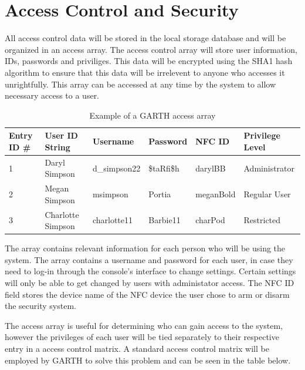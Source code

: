 \documentclass{report}
\begin{document}
\section{Access Control and Security}

All access control data will be stored in the local storage database and will be
organized in an access array. The access control array will store user
information, IDs, passwords and priviliges.  This data will be encrypted using
the SHA1 hash algorithm to ensure that this data will be irrelevent to anyone
who accesses it unrightfully. This array can be accessed at any time by the
system to allow necessary access to a user. 

\begin{table}[h]
    \caption{Example of a GARTH access array}
    \label{access_array}
    \centering
    \begin{tabular}{| l | l | l | l | l | l |}
    \hline
    \textbf{Entry ID \#}&\textbf{User ID String}&\textbf{Username}&
    \textbf{Password}&\textbf{NFC ID}&\textbf{Privilege Level} \\ \hline
    1&Daryl Simpson&d\_simpson22&\$taRfi\$h&darylBB&Administrator \\ \hline
    2&Megan Simpson&msimpson&Portia&meganBold&Regular User \\ \hline
    3&Charlotte Simpson&charlotte11&Barbie11&charPod&Restricted \\
    \hline
    \end{tabular}
\end{table}

The array contains relevant information for each person who will be using the
system. The array contains a username and password for each user, in case
they need to log-in through the console's interface to change settings. Certain
settings will only be able to get changed by users with administator access.
The NFC ID field stores the device name of the NFC device the user chose to arm
or disarm the security system.

The access array is useful for determining who can gain access to the system,
however the privileges of each user will be tied separately to their respective
entry in a access control matrix. A standard access control matrix will be
employed by GARTH to solve this problem and can be seen in the table below.
\end{document}
